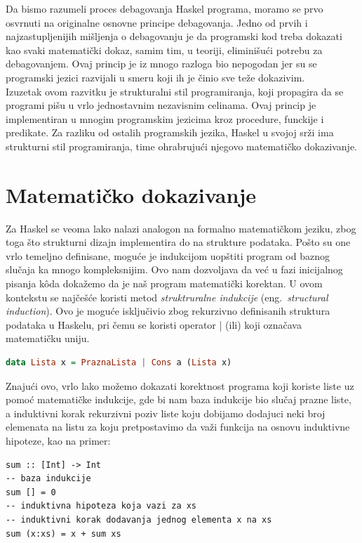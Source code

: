 \documentclass[a4paper]{article}
\begin{document}
{{Da bismo razumeli proces debagovanja Haskel programa, moramo se prvo osvrnuti na originalne osnovne principe debagovanja. Jedno od prvih i najzastupljenijih mišljenja o debagovanju je da programski kod treba dokazati kao svaki matematički dokaz, samim tim, u teoriji, eliminišući potrebu za debagovanjem. Ovaj princip je iz mnogo razloga bio nepogodan jer su se programski jezici razvijali u smeru koji ih je činio sve teže dokazivim.\cite{pope2006declarative} \\

Izuzetak ovom razvitku je strukturalni stil programiranja, koji propagira da se programi pišu u vrlo jednostavnim nezavisnim celinama. Ovaj princip je implementiran u mnogim programskim jezicima kroz procedure, funckije i predikate. Za razliku od ostalih programskih jezika, Haskel u svojoj srži ima strukturni stil programiranja, time ohrabrujući njegovo matematičko dokazivanje.\cite{pope2006declarative}

\section{Matematičko dokazivanje}

Za Haskel se veoma lako nalazi analogon na formalno matematičkom jeziku, zbog toga što strukturni dizajn implementira do na strukture podataka. Pošto su one vrlo temeljno definisane, moguće je indukcijom uopštiti program od baznog slučaja ka mnogo kompleksnijim. Ovo nam dozvoljava da već u fazi inicijalnog pisanja k\^{o}da dokažemo da je naš program matematički korektan. U ovom kontekstu se najčešće koristi metod {\em struktruralne indukcije}  (eng.~{\em structural induction}). Ovo je moguće isključivio zbog rekurzivno definisanih struktura podataka u Haskelu, pri čemu se koristi operator | (ili) koji označava matematičku uniju.\cite{craftOfFuncProg}
\newpage
\begin{lstlisting}[language=Haskell,caption={Rekurzivno definisanje liste u Haskelu},frame=single, label=simple]
data Lista x = PraznaLista | Cons a (Lista x)
\end{lstlisting}
Znajući ovo, vrlo lako možemo dokazati korektnost programa koji koriste liste uz pomoć matematičke indukcije, gde bi nam baza indukcije bio slučaj prazne liste, a induktivni korak rekurzivni poziv liste koju dobijamo dodajuci neki broj elemenata na listu za koju pretpostavimo da važi funkcija na osnovu induktivne hipoteze, kao na primer:
\begin{lstlisting}[caption={Primer rekurzivno definisane funkcije},frame=single, label=simple]
sum :: [Int] -> Int
-- baza indukcije
sum [] = 0
-- induktivna hipoteza koja vazi za xs
-- induktivni korak dodavanja jednog elementa x na xs
sum (x:xs) = x + sum xs 
\end{lstlisting}


}}
\end{document}
